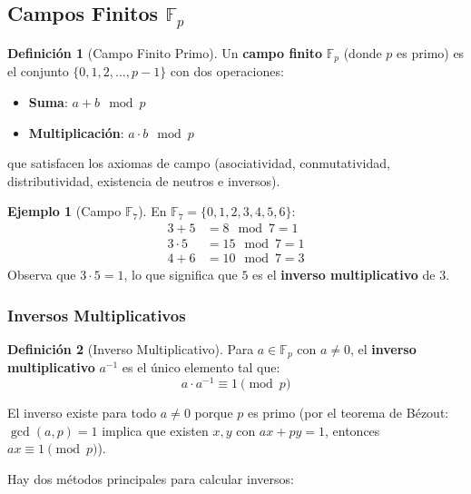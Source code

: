\documentclass[11pt,a4paper,twoside,openright]{book}
\theoremstyle{definition}
\newtheorem{definition}{Definición}[chapter]
\newtheorem{example}{Ejemplo}[chapter]
\theoremstyle{plain}
\theoremstyle{remark}
\begin{document}
\subsection{Campos Finitos $\mathbb{F}_p$}

\begin{definition}[Campo Finito Primo]
Un \textbf{campo finito} $\mathbb{F}_p$ (donde $p$ es primo) es el conjunto $\{0, 1, 2, \ldots, p-1\}$ con dos operaciones:
\begin{itemize}
    \item \textbf{Suma}: $a + b \mod p$
    \item \textbf{Multiplicación}: $a \cdot b \mod p$
\end{itemize}
que satisfacen los axiomas de campo (asociatividad, conmutatividad, distributividad, existencia de neutros e inversos).
\end{definition}

\begin{example}[Campo $\mathbb{F}_7$]
En $\mathbb{F}_7 = \{0, 1, 2, 3, 4, 5, 6\}$:
\begin{align*}
    3 + 5 &= 8 \mod 7 = 1 \\
    3 \cdot 5 &= 15 \mod 7 = 1 \\
    4 + 6 &= 10 \mod 7 = 3
\end{align*}
Observa que $3 \cdot 5 = 1$, lo que significa que $5$ es el \textbf{inverso multiplicativo} de $3$.
\end{example}

\subsubsection{Inversos Multiplicativos}

\begin{definition}[Inverso Multiplicativo]
Para $a \in \mathbb{F}_p$ con $a \neq 0$, el \textbf{inverso multiplicativo} $a^{-1}$ es el único elemento tal que:
\[ a \cdot a^{-1} \equiv 1 \pmod{p} \]
\end{definition}

\begin{mathnote}
El inverso existe para todo $a \neq 0$ porque $p$ es primo (por el teorema de Bézout: $\gcd(a, p) = 1$ implica que existen $x, y$ con $ax + py = 1$, entonces $ax \equiv 1 \pmod{p}$).
\end{mathnote}

Hay dos métodos principales para calcular inversos:
\end{document}
